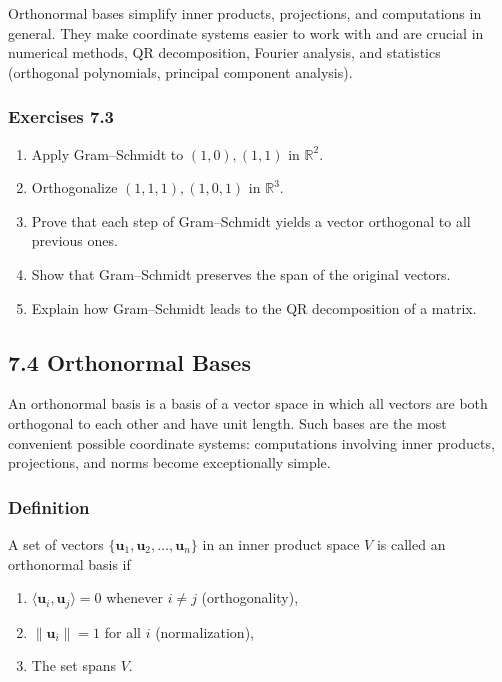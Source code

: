 \documentclass[
  12pt,
  a4paper,
]{article}
\begin{document}
Orthonormal bases simplify inner products, projections, and computations
in general. They make coordinate systems easier to work with and are
crucial in numerical methods, QR decomposition, Fourier analysis, and
statistics (orthogonal polynomials, principal component analysis).

\subsubsection{Exercises 7.3}\label{exercises-73}

\begin{enumerate}
\def\labelenumi{\arabic{enumi}.}
\item
  Apply Gram--Schmidt to \((1,0), (1,1)\) in \(\mathbb{R}^2\).
\item
  Orthogonalize \((1,1,1), (1,0,1)\) in \(\mathbb{R}^3\).
\item
  Prove that each step of Gram--Schmidt yields a vector orthogonal to
  all previous ones.
\item
  Show that Gram--Schmidt preserves the span of the original vectors.
\item
  Explain how Gram--Schmidt leads to the QR decomposition of a matrix.
\end{enumerate}

\subsection{7.4 Orthonormal Bases}\label{74-orthonormal-bases}

An orthonormal basis is a basis of a vector space in which all vectors
are both orthogonal to each other and have unit length. Such bases are
the most convenient possible coordinate systems: computations involving
inner products, projections, and norms become exceptionally simple.

\subsubsection{Definition}\label{definition-4}

A set of vectors \(\{\mathbf{u}_1, \mathbf{u}_2, \dots, \mathbf{u}_n\}\)
in an inner product space \(V\) is called an orthonormal basis if

\begin{enumerate}
\def\labelenumi{\arabic{enumi}.}
\item
  \(\langle \mathbf{u}_i, \mathbf{u}_j \rangle = 0\) whenever
  \(i \neq j\) (orthogonality),
\item
  \(\|\mathbf{u}_i\| = 1\) for all \(i\) (normalization),
\item
  The set spans \(V\).
\end{enumerate}
\end{document}
